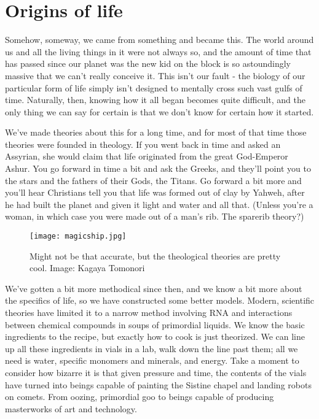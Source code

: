 \section{Origins of life}

Somehow, someway, we came from something and became this. The world around us and all the living things in it were not always so, and the amount of time that has passed since our planet was the new kid on the block is so astoundingly massive that we can’t really conceive it. This isn’t our fault - the biology of our particular form of life simply isn’t designed to mentally cross such vast gulfs of time. Naturally, then, knowing how it all began becomes quite difficult, and the only thing we can say for certain is that we don’t know for certain how it started.

We’ve made theories about this for a long time, and for most of that time those theories were founded in theology. If you went back in time and asked an Assyrian, she would claim that life originated from the great God-Emperor Ashur. You go forward in time a bit and ask the Greeks, and they’ll point you to the stars and the fathers of their Gods, the Titans. Go forward a bit more and you’ll hear Christians tell you that life was formed out of clay by Yahweh, after he had built the planet and given it light and water and all that. (Unless you’re a woman, in which case you were made out of a man’s rib. The sparerib theory?) 

\begin{figure}
  \centering
    \texttt{[image: magicship.jpg]}
\caption{Might not be that accurate, but the theological theories are pretty cool. Image: Kagaya Tomonori}
\end{figure}

We’ve gotten a bit more methodical since then, and we know a bit more about the specifics of life, so we have constructed some better models. Modern, scientific theories have limited it to a narrow method involving RNA and interactions between chemical compounds in soups of primordial liquids. We know the basic ingredients to the recipe, but exactly how to cook is just theorized. We can line up all these ingredients in vials in a lab, walk down the line past them; all we need is water, specific monomers and minerals, and energy. Take a moment to consider how bizarre it is that given pressure and time, the contents of the vials have turned into beings capable of painting the Sistine chapel and landing robots on comets. From oozing, primordial goo to beings capable of producing masterworks of art and technology.

